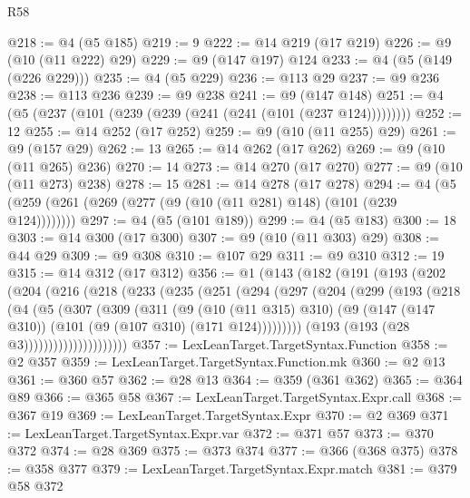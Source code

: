 \begin{lexlean}{R58}
\begin{coremodule}
@218 := @4 (@5 @185)
@219 := 9
@222 := @14 @219 (@17 @219)
@226 := @9 (@10 (@11 @222) @29)
@229 := @9 (@147 @197) @124
@233 := @4 (@5 (@149 (@226 @229)))
@235 := @4 (@5 @229)
@236 := @113 @29
@237 := @9 @236
@238 := @113 @236
@239 := @9 @238
@241 := @9 (@147 @148)
@251 := @4 (@5 (@237 (@101 (@239 (@239 (@241 (@241 (@101 (@237 @124)))))))))
@252 := 12
@255 := @14 @252 (@17 @252)
@259 := @9 (@10 (@11 @255) @29)
@261 := @9 (@157 @29)
@262 := 13
@265 := @14 @262 (@17 @262)
@269 := @9 (@10 (@11 @265) @236)
@270 := 14
@273 := @14 @270 (@17 @270)
@277 := @9 (@10 (@11 @273) @238)
@278 := 15
@281 := @14 @278 (@17 @278)
@294 := @4 (@5 (@259 (@261 (@269 (@277 (@9 (@10 (@11 @281) @148) (@101 (@239 @124))))))))
@297 := @4 (@5 (@101 @189))
@299 := @4 (@5 @183)
@300 := 18
@303 := @14 @300 (@17 @300)
@307 := @9 (@10 (@11 @303) @29)
@308 := @44 @29
@309 := @9 @308
@310 := @107 @29
@311 := @9 @310
@312 := 19
@315 := @14 @312 (@17 @312)
@356 := @1
    (@143
      (@182
        (@191
          (@193
            (@202
              (@204
                (@216
                  (@218
                    (@233
                      (@235
                        (@251
                          (@294
                            (@297
                              (@204
                                (@299
                                  (@193
                                    (@218
                                      (@4
                                        (@5
                                          (@307
                                            (@309
                                              (@311
                                                (@9
                                                  (@10 (@11 @315) @310)
                                                  (@9
                                                    (@147 (@147 @310))
                                                    (@101 (@9 (@107 @310) (@171 @124)))))))))
                                        (@193 (@193 (@28 @3)))))))))))))))))))))
@357 := LexLeanTarget.TargetSyntax.Function
@358 := @2 @357
@359 := LexLeanTarget.TargetSyntax.Function.mk
@360 := @2 @13
@361 := @360 @57
@362 := @28 @13
@364 := @359 (@361 @362)
@365 := @364 @89
@366 := @365 @58
@367 := LexLeanTarget.TargetSyntax.Expr.call
@368 := @367 @19
@369 := LexLeanTarget.TargetSyntax.Expr
@370 := @2 @369
@371 := LexLeanTarget.TargetSyntax.Expr.var
@372 := @371 @57
@373 := @370 @372
@374 := @28 @369
@375 := @373 @374
@377 := @366 (@368 @375)
@378 := @358 @377
@379 := LexLeanTarget.TargetSyntax.Expr.match
@381 := @379 @58 @372

\end{coremodule}
\end{lexlean}
